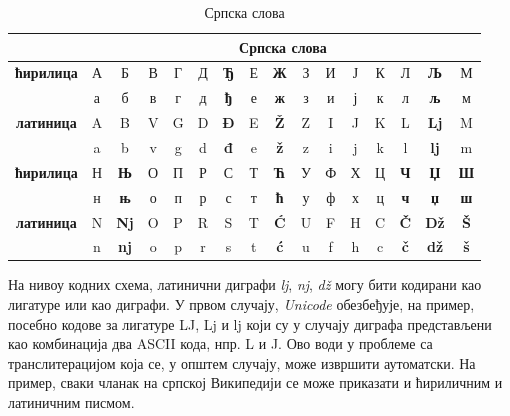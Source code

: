 \begin{multicols}{2}
\begin{table}[ht]
\begin{center}
\renewcommand{\arraystretch}{1.5}
\setlength{\arrayrulewidth}{1pt}
\begin{tabular}{|c|c|c|c|c|c|c|c|c|c|c|c|c|c|c|c|}
\cline{2-16}
\multicolumn{1}{c}{} & \multicolumn{15}{|c|}{{\textbf{Српска слова}}} \\
\hline
{\textbf{ћирилица}} & А & Б & В & Г & Д & \textbf{Ђ} & Е & \textbf{Ж} & З & И & Ј & К & Л & \textbf{Љ} & М \\ 
         & а & б & в & г & д & \textbf{ђ} & е & \textbf{ж} & з & и & ј & к & л & \textbf{љ} & м \\
\hline
{\textbf{латиница}} & A & B & V & G & D & \cellcolor{grey3}\textbf{Đ} & E & \cellcolor{grey3}\textbf{Ž} & Z & I & J & K & L & \cellcolor{grey2} \textbf{Lj} & M \\
         & a & b & v & g & d & \cellcolor{grey3} \textbf{đ} & e & \cellcolor{grey3}\textbf{ž} & z & i & j & k & l & \cellcolor{grey2} \textbf{lj} & m \\
\hline
{\textbf{ћирилица}} & Н & \textbf{Њ} & О & П & Р & С & Т & \textbf{Ћ} & У & Ф & Х & Ц & \textbf{Ч} & \textbf{Џ} & \textbf{Ш} \\
        & н & \textbf{њ} & о & п & р & с & т & \textbf{ћ} & у & ф & х & ц & \textbf{ч} & \textbf{џ} &  \textbf{ш} \\
\hline
{\textbf{латиница}} & N & \cellcolor{grey2} \textbf{Nj} & O & P & R & S & T & \cellcolor{grey3} \textbf{Ć} & U & F & H & C & \cellcolor{grey3} \textbf{Č} & \cellcolor{grey2} \textbf{Dž} & \cellcolor{grey3} \textbf{Š} \\
         & n & \cellcolor{grey2} \textbf{nj} & o & p & r & s & t & \cellcolor{grey3} \textbf{ć} & u & f & h & c & \cellcolor{grey3} \textbf{č} & \cellcolor{grey2} \textbf{dž} & \cellcolor{grey3} \textbf{š} \\
\hline
\end{tabular}
\end{center}
\caption{Српска слова}
 \label{azbuka}
\end{table}

На нивоу кодних схема, латинични диграфи \textit{lj}, \textit{nj}, \textit{dž} могу бити кодирани као лигатуре или као диграфи. У првом случају, \textit{Unicode} \cite{UNICODE} обезбеђује, на пример, посебно кодове за лигатуре LJ, Lj и lj који су у случају диграфа представљени као комбинација два ASCII кода,  нпр. L и J. Ово води у проблеме са транслитерацијом  која се, у општем случају, може извршити аутоматски. На пример, сваки чланак на српској Википедији се може приказати и ћириличним и латиничним писмом. 


\end{multicols}
